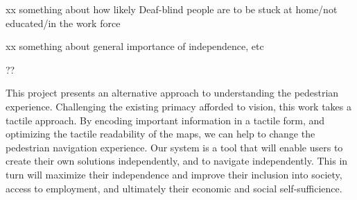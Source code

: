 xx something about how likely Deaf-blind people are to be stuck at home/not educated/in the work force

xx something about general importance of independence, etc

??


This project presents an alternative approach to understanding the pedestrian experience. Challenging the existing primacy afforded to vision, this work takes a tactile approach. 
By encoding important information in a tactile form, and optimizing the tactile readability of the maps, we can help to change the pedestrian navigation experience. Our system is a tool that will enable users to create their own solutions independently, and to navigate independently. This in turn will maximize their independence and improve their inclusion into society, access to employment, and ultimately their economic and social self-sufficience. 